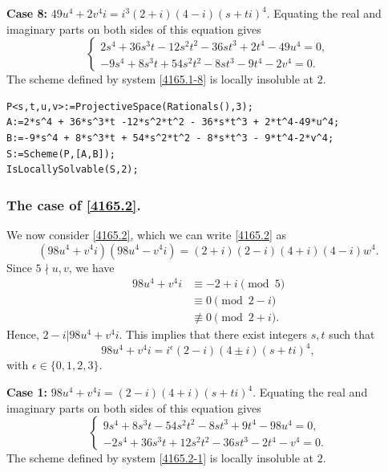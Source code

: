 \documentclass[a4paper,12pt,english,reqno]{amsart}
\begin{document}
{\bf Case 8:} $49u^4+2v^4i=i^3(2+i)(4-i)(s+ti)^4$. Equating the real and imaginary parts on both sides of this equation gives
\begin{equation}\label{4165.1-8}
\begin{cases}
2s^4 + 36s^3t - 12s^2t^2 - 36st^3 + 2t^4 - 49u^4=0,\\
-9s^4 + 8s^3t + 54s^2t^2 - 8st^3 - 9t^4 - 2v^4=0.
\end{cases}
\end{equation}
The scheme defined by system \eqref{4165.1-8} is locally insoluble at $2$.

\begin{lstlisting}
P<s,t,u,v>:=ProjectiveSpace(Rationals(),3);
A:=2*s^4 + 36*s^3*t -12*s^2*t^2 - 36*s*t^3 + 2*t^4-49*u^4;
B:=-9*s^4 + 8*s^3*t + 54*s^2*t^2 - 8*s*t^3 - 9*t^4-2*v^4;
S:=Scheme(P,[A,B]);
IsLocallySolvable(S,2);
\end{lstlisting}



\subsubsection{\bf{The case of \eqref{4165.2}.}}%
We now consider \eqref{4165.2}, which we can write \eqref{4165.2} as
\begin{equation} (98u^4+v^4i)(98u^4-v^4i)=(2+i)(2-i)(4+i)(4-i)w^4.
\end{equation}
Since $5\nmid u,v$, we have 
\[\begin{split}98u^4+v^4i&\equiv -2+i\pmod{5}\\
&\equiv 0\pmod{2-i}\\
&\not\equiv 0\pmod{2+i}.\end{split}\]
Hence, $2-i|98u^4+v^4i$. This implies that there exist integers $s,t$ such that 
\[98u^4+v^4i=i^{\epsilon}(2-i)(4\pm i)(s+ti)^4,\]
with $\epsilon \in \{0,1,2,3\}$.




{\bf Case 1:} $98u^4+v^4i=(2-i)(4+i)(s+ti)^4$. Equating the real and imaginary parts on both sides of this equation gives
\begin{equation}\label{4165.2-1}
\begin{cases}
9s^4 + 8s^3t - 54s^2t^2 - 8st^3 + 9t^4 - 98u^4=0,\\
-2s^4 + 36s^3t + 12s^2t^2 - 36st^3 - 2t^4 - v^4=0.
\end{cases}
\end{equation}
The scheme defined by system \eqref{4165.2-1} is locally insoluble at $2$.
\end{document}

